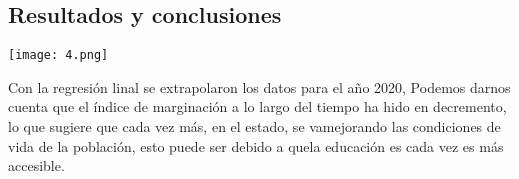 \documentclass[12pt]{article}
\begin{document}
\subsection{Resultados y conclusiones}
\texttt{[image: 4.png]}\par
Con la regresión linal se extrapolaron los datos para el año 2020, Podemos darnos cuenta que el índice de marginación a lo largo del tiempo ha hido en decremento, lo que sugiere que cada vez más, en el estado, se vamejorando las condiciones de vida de la población, esto puede ser debido a quela educación es cada vez es más accesible.
\end{document}
